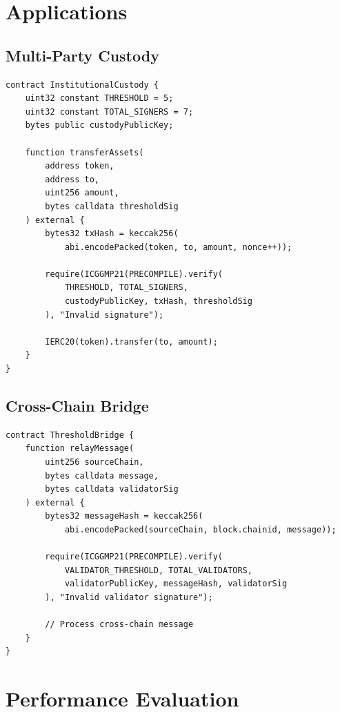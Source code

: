 \documentclass[11pt,a4paper]{article}
\theoremstyle{definition}
\begin{document}
\section{Applications}

\subsection{Multi-Party Custody}

\begin{lstlisting}[language=Solidity]
contract InstitutionalCustody {
    uint32 constant THRESHOLD = 5;
    uint32 constant TOTAL_SIGNERS = 7;
    bytes public custodyPublicKey;

    function transferAssets(
        address token,
        address to,
        uint256 amount,
        bytes calldata thresholdSig
    ) external {
        bytes32 txHash = keccak256(
            abi.encodePacked(token, to, amount, nonce++));

        require(ICGGMP21(PRECOMPILE).verify(
            THRESHOLD, TOTAL_SIGNERS,
            custodyPublicKey, txHash, thresholdSig
        ), "Invalid signature");

        IERC20(token).transfer(to, amount);
    }
}
\end{lstlisting}

\subsection{Cross-Chain Bridge}

\begin{lstlisting}[language=Solidity]
contract ThresholdBridge {
    function relayMessage(
        uint256 sourceChain,
        bytes calldata message,
        bytes calldata validatorSig
    ) external {
        bytes32 messageHash = keccak256(
            abi.encodePacked(sourceChain, block.chainid, message));

        require(ICGGMP21(PRECOMPILE).verify(
            VALIDATOR_THRESHOLD, TOTAL_VALIDATORS,
            validatorPublicKey, messageHash, validatorSig
        ), "Invalid validator signature");

        // Process cross-chain message
    }
}
\end{lstlisting}

\section{Performance Evaluation}
\end{document}
